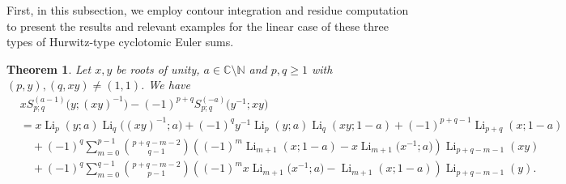 \documentclass[11pt]{article}
\DeclareMathOperator{\Li}{Li}
\def\N{\mathbb{N}}
\theoremstyle{plain}
\newtheorem{thm}{Theorem}[section]
\theoremstyle{definition}
\begin{document}
First, in this subsection, we employ contour integration and residue computation to present the results and relevant examples for the linear case of these three types of Hurwitz-type cyclotomic Euler sums.

\begin{thm}\label{thm-linearCES} Let $x,y$ be roots of unity, $a\in \mathbb{C}\setminus \N$ and $p,q\geq 1$ with $(p,y), (q,xy)\neq (1,1)$. We have
\begin{align}
&x S_{p;q}^{(a-1)}\Big(y;(xy)^{-1}\Big)-(-1)^{p+q} S_{p;q}^{(-a)}\Big(y^{-1};xy\Big)\nonumber\\
&=x \Li_{p}(y;a)\Li_q\Big((xy)^{-1};a\Big)+(-1)^{q} y^{-1} \Li_p(y;a)\Li_q(xy;1-a)+(-1)^{p+q-1}\Li_{p+q}(x;1-a)\nonumber\\
&\quad+(-1)^q \sum_{m=0}^{p-1}\binom{p+q-m-2}{q-1}\left((-1)^m \Li_{m+1}(x;1-a)-x\Li_{m+1}\Big(x^{-1};a\Big)\right)\Li_{p+q-m-1}(xy)\nonumber\\
&\quad+(-1)^q \sum_{m=0}^{q-1}\binom{p+q-m-2}{p-1}\left((-1)^m x\Li_{m+1}\Big(x^{-1};a\Big)-\Li_{m+1}(x;1-a)\right)\Li_{p+q-m-1}(y).
\end{align}
\end{thm}
\end{document}
